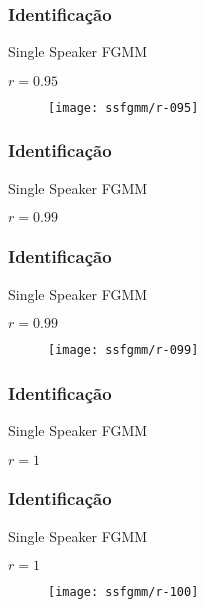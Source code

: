 \begin{frame}
\frametitle{Identificação}
\begin{description}
    \item[SSFGMM] Single Speaker FGMM
    \item $r = 0.95$
\end{description}

\begin{figure}[ht]
    \centering
    \texttt{[image: ssfgmm/r-095]}
\end{figure}
\end{frame}

\begin{frame}
\frametitle{Identificação}
\begin{description}
    \item[SSFGMM] Single Speaker FGMM
    \item $r = 0.99$
\end{description}


\end{frame}

\begin{frame}
\frametitle{Identificação}
\begin{description}
    \item[SSFGMM] Single Speaker FGMM
    \item $r = 0.99$
\end{description}

\begin{figure}[ht]
    \centering
    \texttt{[image: ssfgmm/r-099]}
\end{figure}
\end{frame}

\begin{frame}
\frametitle{Identificação}
\begin{description}
    \item[SSFGMM] Single Speaker FGMM
    \item $r = 1$
\end{description}


\end{frame}

\begin{frame}
\frametitle{Identificação}
\begin{description}
    \item[SSFGMM] Single Speaker FGMM
    \item $r = 1$
\end{description}

\begin{figure}[ht]
    \centering
    \texttt{[image: ssfgmm/r-100]}
\end{figure}
\end{frame}

